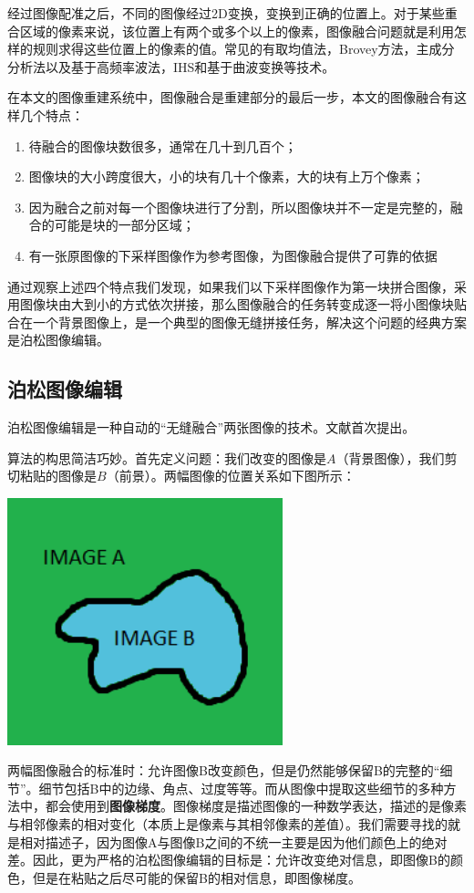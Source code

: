 经过图像配准之后，不同的图像经过2D变换，变换到正确的位置上。对于某些重合区域的像素来说，该位置上有两个或多个以上的像素，图像融合问题就是利用怎样的规则求得这些位置上的像素的值。常见的有取均值法，Brovey方法，主成分分析法以及基于高频率波法，IHS和基于曲波变换等技术。

在本文的图像重建系统中，图像融合是重建部分的最后一步，本文的图像融合有这样几个特点：

\begin{enumerate}
\item 待融合的图像块数很多，通常在几十到几百个；
\item 图像块的大小跨度很大，小的块有几十个像素，大的块有上万个像素；
\item 因为融合之前对每一个图像块进行了分割，所以图像块并不一定是完整的，融合的可能是块的一部分区域；
\item 有一张原图像的下采样图像作为参考图像，为图像融合提供了可靠的依据
\end{enumerate}

通过观察上述四个特点我们发现，如果我们以下采样图像作为第一块拼合图像，采用图像块由大到小的方式依次拼接，那么图像融合的任务转变成逐一将小图像块贴合在一个背景图像上，是一个典型的图像无缝拼接任务，解决这个问题的经典方案是泊松图像编辑。

\subsection{泊松图像编辑}
泊松图像编辑是一种自动的“无缝融合”两张图像的技术。文献\cite{Perez:2003ul}首次提出。

算法的构思简洁巧妙。首先定义问题：我们改变的图像是\(A\)（背景图像），我们剪切粘贴的图像是\(B\)（前景）。两幅图像的位置关系如下图所示：

\includegraphics[width=8.00cm]{imgs/ch2/poi_ab}

两幅图像融合的标准时：允许图像B改变颜色，但是仍然能够保留B的完整的“细节”。细节包括B中的边缘、角点、过度等等。而从图像中提取这些细节的多种方法中，都会使用到\textbf{图像梯度}。图像梯度是描述图像的一种数学表达，描述的是像素与相邻像素的相对变化（本质上是像素与其相邻像素的差值）。我们需要寻找的就是相对描述子，因为图像A与图像B之间的不统一主要是因为他们颜色上的绝对差。因此，更为严格的泊松图像编辑的目标是：允许改变绝对信息，即图像B的颜色，但是在粘贴之后尽可能的保留B的相对信息，即图像梯度。

